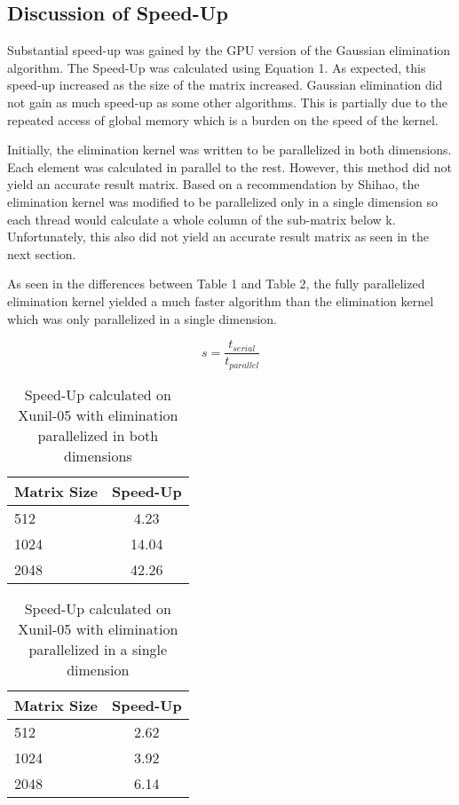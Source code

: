 \documentclass[12pt]{article}
\begin{document}
\subsection{Discussion of Speed-Up}

Substantial speed-up was gained by the GPU version of the
Gaussian elimination algorithm. The Speed-Up was calculated 
using Equation 1. As expected, this speed-up increased as
the size of the matrix increased. Gaussian elimination
did not gain as much speed-up as some other algorithms.
This is partially due to the repeated access of global 
memory which is a burden on the speed of the kernel.

Initially, the elimination kernel was written to be parallelized 
in both dimensions. Each element was calculated in parallel to the
rest. However, this method did not yield an accurate result matrix.
Based on a recommendation by Shihao, the elimination kernel was
modified to be parallelized only in a single dimension so each 
thread would calculate a whole column of the sub-matrix below k.
Unfortunately, this also did not yield an accurate result matrix
as seen in the next section. 

As seen in the differences between Table 1 and Table 2, the 
fully parallelized elimination kernel yielded a much faster
algorithm than the elimination kernel which was only parallelized
in a single dimension.

\begin{equation}
    s = \frac{t_{serial}}{t_{parallel}}\label{eq1}
\end{equation}

\begin{table}[H]
\centering
\begin{tabular}{@{}|l|c|}
\hline
Matrix Size & Speed-Up \\ \hline
512  &  4.23   \\ \hline
1024 &  14.04  \\ \hline
2048 &  42.26  \\ \hline
\end{tabular}
\caption{Speed-Up calculated on Xunil-05 with elimination parallelized in
both dimensions}
\end{table}

\begin{table}[H]
\centering
\begin{tabular}{@{}|l|c|}
\hline
Matrix Size & Speed-Up \\ \hline
512  &  2.62   \\ \hline
1024 &  3.92  \\ \hline
2048 &  6.14  \\ \hline
\end{tabular}
\caption{Speed-Up calculated on Xunil-05 with elimination parallelized
in a single dimension}
\end{table}
\end{document}
